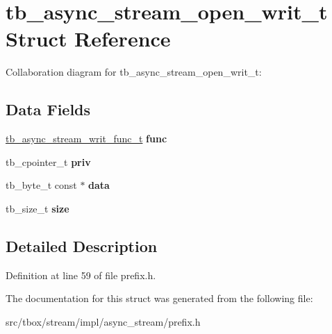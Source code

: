 \hypertarget{structtb__async__stream__open__writ__t}{\section{tb\-\_\-async\-\_\-stream\-\_\-open\-\_\-writ\-\_\-t Struct Reference}
\label{structtb__async__stream__open__writ__t}
}


Collaboration diagram for tb\-\_\-async\-\_\-stream\-\_\-open\-\_\-writ\-\_\-t\-:
\subsection*{Data Fields}
\begin{DoxyCompactItemize}
\item 
\hypertarget{structtb__async__stream__open__writ__t_ad30fb5d9e1adabe83e887124fef3c83d}{\hyperlink{async__stream_8h_a388210c1b03dbf28cf3f47f26449beb5}{tb\-\_\-async\-\_\-stream\-\_\-writ\-\_\-func\-\_\-t} {\bfseries func}}\label{structtb__async__stream__open__writ__t_ad30fb5d9e1adabe83e887124fef3c83d}

\item 
\hypertarget{structtb__async__stream__open__writ__t_a2ef79ff247ad143f19c523a31c966889}{tb\-\_\-cpointer\-\_\-t {\bfseries priv}}\label{structtb__async__stream__open__writ__t_a2ef79ff247ad143f19c523a31c966889}

\item 
\hypertarget{structtb__async__stream__open__writ__t_a94c751669bf4417b2b64723adb2e9210}{tb\-\_\-byte\-\_\-t const $\ast$ {\bfseries data}}\label{structtb__async__stream__open__writ__t_a94c751669bf4417b2b64723adb2e9210}

\item 
\hypertarget{structtb__async__stream__open__writ__t_a817467ef4ef73ec24d4820ef2dfc13f4}{tb\-\_\-size\-\_\-t {\bfseries size}}\label{structtb__async__stream__open__writ__t_a817467ef4ef73ec24d4820ef2dfc13f4}

\end{DoxyCompactItemize}


\subsection{Detailed Description}


Definition at line 59 of file prefix.\-h.



The documentation for this struct was generated from the following file\-:\begin{DoxyCompactItemize}
\item 
src/tbox/stream/impl/async\-\_\-stream/prefix.\-h\end{DoxyCompactItemize}
